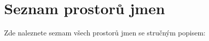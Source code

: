 \section{Seznam prostorů jmen}
Zde naleznete seznam všech prostorů jmen se stručným popisem:\begin{DoxyCompactList}
\item{}
\end{DoxyCompactList}
